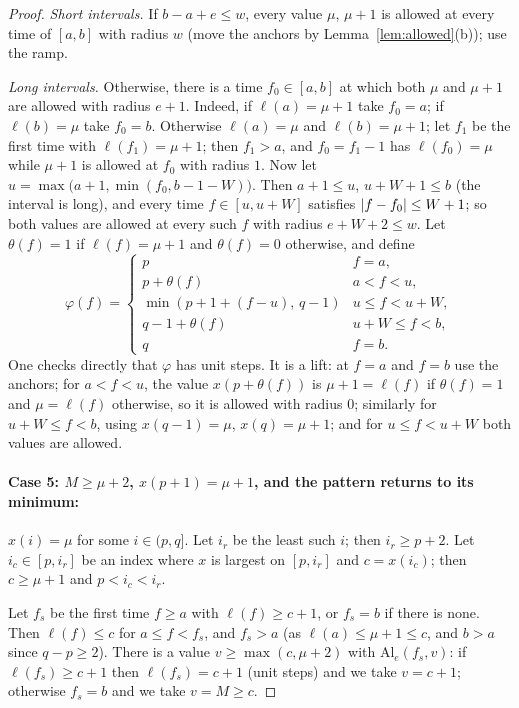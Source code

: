\begin{proof}
\emph{Short intervals.} If $b-a+e\le w$, every value $\mu$, $\mu+1$ is allowed at every time of $[a,b]$ with radius $w$
(move the anchors by Lemma~\ref{lem:allowed}(b)); use the ramp.

\emph{Long intervals.} Otherwise, there is a time $f_0\in[a,b]$ at which both $\mu$ and $\mu+1$ are allowed with radius
$e+1$. Indeed, if $\ell(a)=\mu+1$ take $f_0=a$; if $\ell(b)=\mu$ take $f_0=b$. Otherwise $\ell(a)=\mu$ and $\ell(b)=\mu+1$;
let $f_1$ be the first time with $\ell(f_1)=\mu+1$; then $f_1>a$, and $f_0=f_1-1$ has $\ell(f_0)=\mu$ while $\mu+1$ is
allowed at $f_0$ with radius $1$. Now let $u=\max\bigl(a+1,\min(f_0,b-1-W)\bigr)$. Then $a+1\le u$, $u+W+1\le b$ (the
interval is long), and every time $f\in[u,u+W]$ satisfies $\left\lvert f-f_0\right\rvert\le W+1$; so both values are allowed at every such
$f$ with radius $e+W+2\le w$. Let $\theta(f)=1$ if $\ell(f)=\mu+1$ and $\theta(f)=0$ otherwise, and define
\[
\varphi(f)=\begin{cases}
p & f=a,\\
p+\theta(f) & a<f<u,\\
\min(p+1+(f-u),\,q-1) & u\le f<u+W,\\
q-1+\theta(f) & u+W\le f<b,\\
q & f=b.
\end{cases}
\]
One checks directly that $\varphi$ has unit steps. It is a lift: at $f=a$ and $f=b$ use the anchors; for $a<f<u$, the
value $x(p+\theta(f))$ is $\mu+1=\ell(f)$ if $\theta(f)=1$ and $\mu=\ell(f)$ otherwise, so it is allowed with radius $0$;
similarly for $u+W\le f<b$, using $x(q-1)=\mu$, $x(q)=\mu+1$; and for $u\le f<u+W$ both values are allowed.

\paragraph{Case 5: $M\ge\mu+2$, $x(p+1)=\mu+1$, and the pattern returns to its minimum:} $x(i)=\mu$ for some $i\in(p,q]$.
Let $i_r$ be the least such $i$; then $i_r\ge p+2$. Let $i_c\in[p,i_r]$ be an index where $x$ is largest on $[p,i_r]$
and $c=x(i_c)$; then $c\ge\mu+1$ and $p<i_c<i_r$.

Let $f_s$ be the first time $f\ge a$ with $\ell(f)\ge c+1$, or $f_s=b$ if there is none. Then $\ell(f)\le c$ for
$a\le f<f_s$, and $f_s>a$ (as $\ell(a)\le\mu+1\le c$, and $b>a$ since $q-p\ge2$). There is a value $v\ge\max(c,\mu+2)$ with
$\mathrm{Al}_e(f_s,v)$: if $\ell(f_s)\ge c+1$ then $\ell(f_s)=c+1$ (unit steps) and we take $v=c+1$; otherwise $f_s=b$ and we
take $v=M\ge c$.


\end{proof}

